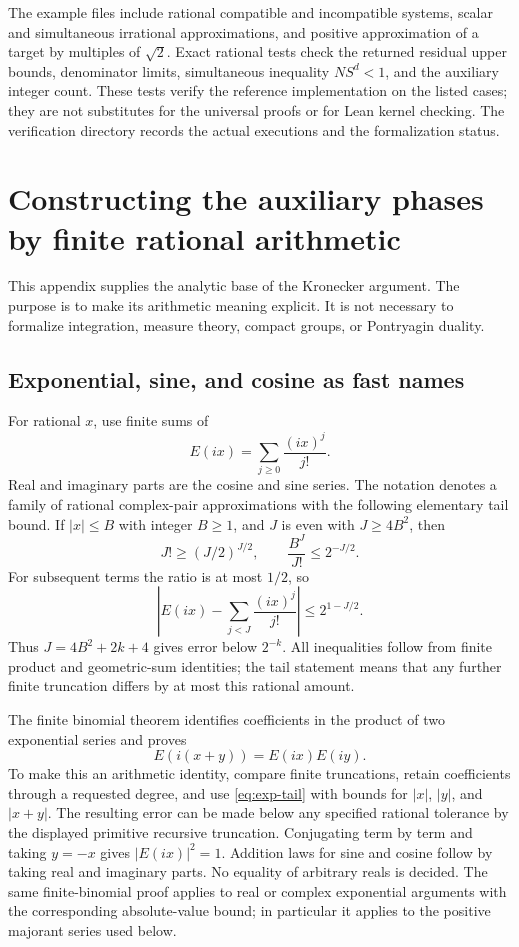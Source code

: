 \documentclass[11pt]{article}
\theoremstyle{definition}\newtheorem{definition}[theorem]{Definition}
\theoremstyle{remark}\newtheorem{remark}[theorem]{Remark}
\begin{document}
The example files include rational compatible and incompatible systems, scalar and simultaneous irrational approximations, and positive approximation of a target by multiples of $\sqrt2$. Exact rational tests check the returned residual upper bounds, denominator limits, simultaneous inequality $NS^d<1$, and the auxiliary integer count. These tests verify the reference implementation on the listed cases; they are not substitutes for the universal proofs or for Lean kernel checking. The verification directory records the actual executions and the formalization status.

\appendix
\section{Constructing the auxiliary phases by finite rational arithmetic}\label{app:trig}

This appendix supplies the analytic base of the Kronecker argument. The purpose is to make its arithmetic meaning explicit. It is not necessary to formalize integration, measure theory, compact groups, or Pontryagin duality.

\subsection{Exponential, sine, and cosine as fast names}

For rational $x$, use finite sums of
\[
 E(ix)=\sum_{j\ge0}\frac{(ix)^j}{j!}.
\]
Real and imaginary parts are the cosine and sine series. The notation denotes a family of rational complex-pair approximations with the following elementary tail bound. If $|x|\le B$ with integer $B\ge1$, and $J$ is even with $J\ge4B^2$, then
\[
 J!\ge(J/2)^{J/2},\qquad
 \frac{B^J}{J!}\le2^{-J/2}.
\]
For subsequent terms the ratio is at most $1/2$, so
\begin{equation}\label{eq:exp-tail}
 \left|E(ix)-\sum_{j<J}\frac{(ix)^j}{j!}\right|
 \le2^{1-J/2}.
\end{equation}
Thus $J=4B^2+2k+4$ gives error below $2^{-k}$. All inequalities follow from finite product and geometric-sum identities; the tail statement means that any further finite truncation differs by at most this rational amount.

The finite binomial theorem identifies coefficients in the product of two exponential series and proves
\[
 E(i(x+y))=E(ix)E(iy).
\]
To make this an arithmetic identity, compare finite truncations, retain coefficients through a requested degree, and use \eqref{eq:exp-tail} with bounds for $|x|$, $|y|$, and $|x+y|$. The resulting error can be made below any specified rational tolerance by the displayed primitive recursive truncation. Conjugating term by term and taking $y=-x$ gives $|E(ix)|^2=1$. Addition laws for sine and cosine follow by taking real and imaginary parts. No equality of arbitrary reals is decided. The same finite-binomial proof applies to real or complex exponential arguments with the corresponding absolute-value bound; in particular it applies to the positive majorant series used below.
\end{document}
